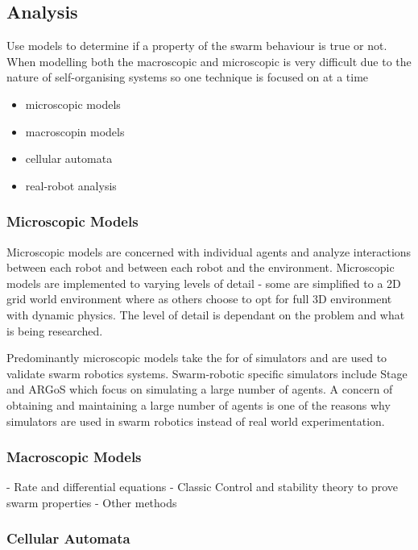 \subsection{Analysis}

Use models to determine if a property of the swarm behaviour is true or not. When modelling both the macroscopic and microscopic is very difficult due to the nature of self-organising systems so one technique is focused on at a time \cite{abbott2006emergence}


\begin{itemize}
	\item microscopic models
	\item macroscopin models
	\item cellular automata
	\item real-robot analysis
\end{itemize}

\subsubsection{Microscopic Models}
Microscopic models are concerned with individual agents and analyze interactions between each robot and between each robot and the environment. Microscopic models are implemented to varying levels of detail - some are simplified to a 2D grid world environment where as others choose to opt for full 3D environment with dynamic physics. The level of detail is dependant on the problem and what is being researched.

Predominantly microscopic models take the for of simulators and are used to validate swarm robotics systems. Swarm-robotic specific simulators include Stage \cite{vaughan2008massively} and ARGoS \cite{pinciroli2011argos} which focus on simulating a large number of agents. A concern of obtaining and maintaining a large number of agents is one of the reasons why simulators are used in swarm robotics instead of real world experimentation.

\subsubsection{Macroscopic Models}

- Rate and differential equations
- Classic Control and stability theory to prove swarm properties
- Other methods
\subsubsection{Cellular Automata}
